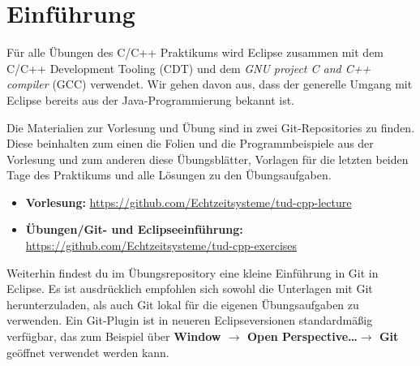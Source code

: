 \section*{Einführung}
Für alle Übungen des C/C++ Praktikums wird Eclipse zusammen mit dem C/C++ Development Tooling (CDT) und dem  \emph{GNU project C and C++ compiler} (GCC) verwendet.
Wir gehen davon aus, dass der generelle Umgang mit Eclipse bereits aus der Java-Programmierung bekannt ist.

Die Materialien zur Vorlesung und Übung sind in zwei Git-Repositories zu finden.
Diese beinhalten zum einen die Folien und die Programmbeispiele aus der Vorlesung und zum anderen diese Übungsblätter, Vorlagen für die letzten beiden Tage des Praktikums und alle Lösungen zu den Übungsaufgaben.

\begin{itemize}
	\item \textbf{Vorlesung:} \url{https://github.com/Echtzeitsysteme/tud-cpp-lecture}
	\item \textbf{Übungen/Git- und Eclipseeinführung:} \url{https://github.com/Echtzeitsysteme/tud-cpp-exercises}
\end{itemize}

Weiterhin findest du im Übungsrepository eine kleine Einführung in Git in Eclipse.
Es ist ausdrücklich empfohlen sich sowohl die Unterlagen mit Git herunterzuladen, als auch Git lokal für die eigenen Übungsaufgaben zu verwenden.
Ein Git-Plugin ist in neueren Eclipseversionen standardmäßig verfügbar, das zum Beispiel über \textbf{Window $\rightarrow$ Open Perspective\dots $\rightarrow$ Git} geöffnet verwendet werden kann.


